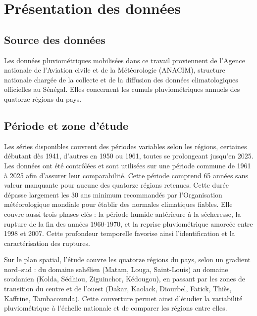\documentclass[12pt,a4paper]{report}
\begin{document}
\vspace{0.45cm}
\noindent{\color{navyblue}\rule{\textwidth}{1.1pt}}
\vspace{0.35cm}

\section{Présentation des données}

\subsection{Source des données}

Les données pluviométriques mobilisées dans ce travail proviennent de l’Agence nationale de l’Aviation civile et de la Météorologie (ANACIM), structure nationale chargée de la collecte et de la diffusion des données climatologiques officielles au Sénégal. Elles concernent les cumuls pluviométriques annuels des quatorze régions du pays.

\subsection{Période et zone d'étude}

Les séries disponibles couvrent des périodes variables selon les régions, certaines débutant dès 1941, d'autres en 1950 ou 1961, toutes se prolongeant jusqu'en 2025. Les données ont été contrôlées et sont utilisées sur une période commune de 1961 à 2025 afin d'assurer leur comparabilité. Cette période comprend 65 années sans valeur manquante pour aucune des quatorze régions retenues. Cette durée dépasse largement les 30 ans minimum recommandés par l'Organisation météorologique mondiale pour établir des normales climatiques fiables. Elle couvre aussi trois phases clés : la période humide antérieure à la sécheresse, la rupture de la fin des années 1960-1970, et la reprise pluviométrique amorcée entre 1998 et 2007. Cette profondeur temporelle favorise ainsi l'identification et la caractérisation des ruptures.

Sur le plan spatial, l'étude couvre les quatorze régions du pays, selon un gradient nord--sud : du domaine sahélien (Matam, Louga, Saint-Louis) au domaine soudanien (Kolda, Sédhiou, Ziguinchor, Kédougou), en passant par les zones de transition du centre et de l'ouest (Dakar, Kaolack, Diourbel, Fatick, Thiès, Kaffrine, Tambacounda). Cette couverture permet ainsi d’étudier la variabilité pluviométrique à l’échelle nationale et de comparer les régions entre elles.
\end{document}
